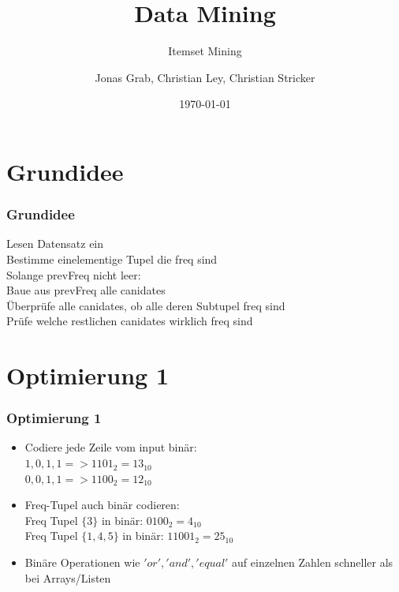 \documentclass{beamer}
\title{Data Mining}
\subtitle{ Itemset Mining}
\author{Jonas Grab, Christian Ley, Christian Stricker}
\date{\today}
\begin{document}
\frame{\titlepage}
\frame{\tableofcontents[currentsection]}



\section{Grundidee}
\begin{frame} %
  \frametitle{Grundidee} %

  		Lesen Datensatz ein\\
  		Bestimme einelementige Tupel die freq sind\\
  		Solange prevFreq nicht leer:\\
  		\hspace{0.7cm}Baue aus prevFreq alle canidates\\
  		\hspace{0.7cm}Überprüfe alle canidates, ob alle deren Subtupel freq sind\\
  		\hspace{0.7cm}Prüfe welche restlichen canidates  wirklich freq sind
\end{frame}



\section{Optimierung 1}
\begin{frame} %
	\frametitle{Optimierung 1} %
	\begin{itemize}
		\item Codiere jede Zeile vom input binär:\\
			\hspace{0.7cm}$1,0,1,1 => 1101_2 = 13_{10}$\\
			\hspace{0.7cm}$0,0,1,1 => 1100_2 = 12_{10}$
		\item Freq-Tupel auch binär codieren:\\
			\hspace{0.7cm} Freq Tupel $\{3\}$ in binär: $0100_2 = 4_{10}$\\
			\hspace{0.7cm} Freq Tupel $\{1,4,5\}$ in binär: $11001_2 = 25_{10}$
		\item Binäre Operationen wie $'or', 'and', 'equal'$ auf einzelnen Zahlen schneller als bei Arrays/Listen
	\end{itemize}
\end{frame}
\end{document}
